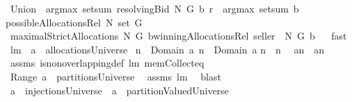 \begin{isabellebody}
{\isafoldproof}%
%
\isadelimproof
%
\endisadelimproof
\isanewline
{}\isamarkupfalse%
\ {\isachardoublequoteopen}{\isacharparenleft}Union\ {\isasymcirc}\ {\isacharparenleft}argmax\ {\isacharparenleft}setsum\ {\isacharparenleft}resolvingBid{\isacharprime}\ N\ G\ b\ {\isacharparenleft}r{\isacharparenright}{\isacharparenright}{\isacharparenright}{\isacharparenright}\ {\isasymcirc}\ {\isacharparenleft}argmax\ {\isacharparenleft}setsum\ b{\isacharparenright}{\isacharparenright}{\isacharparenright}\isanewline
{\isacharparenleft}possibleAllocationsRel\ N\ {\isacharparenleft}set\ G{\isacharparenright}{\isacharparenright}{\isachardoublequoteclose}\isanewline
\isanewline
{}\isamarkupfalse%
\ {\isachardoublequoteopen}maximalStrictAllocations{\isacharprime}\ N\ G\ b{\isacharequal}winningAllocationsRel\ {\isacharparenleft}{\isacharbraceleft}seller{\isacharbraceright}\ {\isasymunion}\ N{\isacharparenright}\ G\ b{\isachardoublequoteclose}%
\isadelimproof
\ %
\endisadelimproof
%
\isatagproof
{}\isamarkupfalse%
\ fast%
\endisatagproof
{\isafoldproof}%
%
\isadelimproof
%
\endisadelimproof
\isanewline
\isanewline
{}\isamarkupfalse%
\ lm{}{}{\isacharcolon}\ \ {\isachardoublequoteopen}a\ {\isasymin}\ allocationsUniverse{\isachardoublequoteclose}\ \isanewline
{\isachardoublequoteopen}n{}\ {\isasymin}\ Domain\ a{\isachardoublequoteclose}\ {\isachardoublequoteopen}n{}\ {\isasymin}\ Domain\ a{\isachardoublequoteclose}\isanewline
{\isachardoublequoteopen}n{}\ {\isasymnoteq}\ n{}{\isachardoublequoteclose}\ \isanewline
{}\ {\isachardoublequoteopen}a{\isacharcomma}{\isacharcomma}n{}\ {\isasyminter}\ a{\isacharcomma}{\isacharcomma}n{}{\isacharequal}{\isacharbraceleft}{\isacharbraceright}{\isachardoublequoteclose}%
\isadelimproof
\ %
\endisadelimproof
%
\isatagproof
{}\isamarkupfalse%
\ assms\ is{\isacharunderscore}non{\isacharunderscore}overlapping{\isacharunderscore}def\ lm{}{}\ mem{\isacharunderscore}Collect{\isacharunderscore}eq\ \isanewline
{}\isamarkupfalse%
\ {\isacharminus}\ \isamarkupfalse%
\ {\isachardoublequoteopen}Range\ a\ {\isasymin}\ partitionsUniverse{\isachardoublequoteclose}\ \isamarkupfalse%
\ assms\ lm{}{}\ \isamarkupfalse%
\ blast\isanewline
{}\isamarkupfalse%
\ \isamarkupfalse%
\ {\isachardoublequoteopen}a\ {\isasymin}\ injectionsUniverse\ {\isacharampersand}\ a\ {\isasymin}\ partitionValuedUniverse{\isachardoublequoteclose}\ \isamarkupfalse%

\end{isabellebody}
